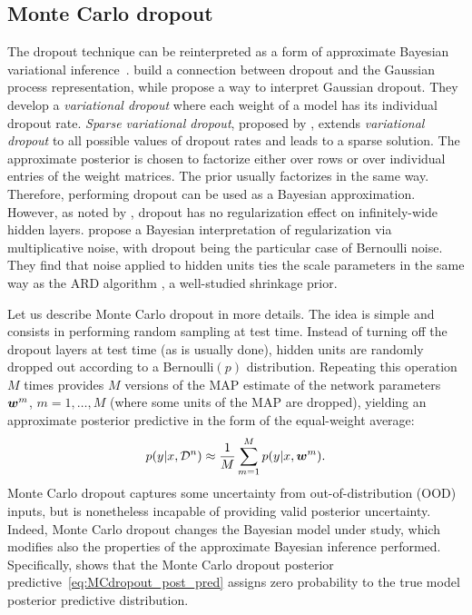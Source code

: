 \subsection{Monte Carlo dropout}

The dropout technique can be reinterpreted as a form of approximate Bayesian variational inference~\citep{kingma2015variational,gal2016dropout}.  \cite{gal2016dropout} build a connection between dropout and the Gaussian process representation, while \citet{kingma2015variational} propose a way to interpret Gaussian dropout. They develop a \textit{variational dropout} where each weight of a model has its individual dropout rate. \textit{Sparse variational dropout}, proposed by \citet{molchanov2017variational}, extends \textit{variational dropout} to all possible values of dropout rates and leads to a sparse solution. The approximate posterior is chosen to factorize either over rows or over individual entries of the weight matrices. The prior usually factorizes in the same way.  Therefore, performing dropout can be used as a Bayesian approximation. However, as noted by \citet{duvenaud2014avoiding}, dropout has no regularization effect on infinitely-wide hidden layers.  \citet{nalisnick2019dropout} propose a Bayesian interpretation of regularization via multiplicative noise, with dropout being the particular case of Bernoulli noise. They find that noise applied to hidden units ties the scale parameters in the same way as the ARD algorithm \citep{neal1996bayesian}, a well-studied shrinkage prior. 

Let us describe Monte Carlo dropout in more details. The idea is simple and consists in performing random sampling at test time. Instead of turning off the dropout layers at test time (as is usually done), hidden units are randomly dropped out according to a Bernoulli$(p)$ distribution. Repeating this operation $M$ times provides $M$ versions of the MAP estimate of the network parameters $\boldsymbol{w}^m$, $m=1,\ldots,M$ (where some units of the MAP are dropped), yielding an approximate posterior predictive in the form of the equal-weight average:
\begin{equation}\label{eq:MCdropout_post_pred}
	p(y\vert x, \mathcal{D}^n)\approx \frac{1}{M}\sum_{m=1}^M p(y\vert x, \boldsymbol{w}^m).
\end{equation}
Monte Carlo dropout captures some uncertainty from out-of-distribution (OOD) inputs, but is nonetheless incapable of providing valid posterior uncertainty. Indeed, Monte Carlo dropout changes the Bayesian model under study, which modifies also the properties of the approximate Bayesian inference performed. Specifically, \cite{folgoc2021mc} shows that the Monte Carlo dropout posterior predictive~\eqref{eq:MCdropout_post_pred} assigns zero probability to the true model posterior predictive distribution.
